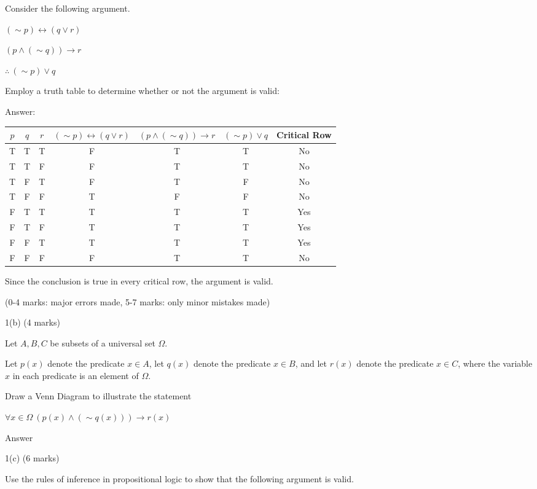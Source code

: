 \documentclass[a4paper,12pt,oneside]{book}
\theoremstyle{definition}
\begin{document}
Consider the following argument.

$(\sim p) \leftrightarrow (q \vee r)$

$(p \wedge (\sim q)) \rightarrow r$

$\therefore \ (\sim p) \vee q$

Employ a truth table to determine whether or not the argument is valid:

Answer:

\begin{center}
	\begin{tabular}{|ccc|c|c|c|c|}
		\hline
		$p$ & $q$ & $r$ &$(\sim p) \leftrightarrow (q \vee r)$ & $(p \wedge (\sim q)) \rightarrow r$ & $(\sim p) \vee q$ & Critical Row \\
		\hline
		T & T & T & F & T & T & No \\
		\hline
		T & T & F & F & T & T & No \\
		\hline
		T & F & T & F & T & F & No \\
		\hline
		T & F & F & T & F & F & No \\
		\hline
		F & T & T & T & T & T & Yes \\
		\hline
		F & T & F & T & T & T & Yes \\
		\hline
		F & F & T & T & T & T & Yes \\
		\hline
		F & F & F & F & T & T & No \\
		\hline  
	\end{tabular} 
\end{center}

Since the conclusion is true in every critical row, the argument is valid.

(0-4 marks: major errors made, 5-7 marks: only minor mistakes made)

1(b) (4 marks)

Let $A,B,C$ be subsets of a universal set $\Omega$.

Let $p(x)$ denote the predicate $x \in A$, let $q(x)$ denote the predicate $x \in B$, and let $r(x)$ denote the predicate $x \in C$, where the variable $x$ in each predicate is an element of $\Omega$.

Draw a Venn Diagram to illustrate the statement

$\forall x \in \Omega \ (p(x) \wedge (\sim q(x))) \rightarrow r(x)$

Answer

1(c) (6 marks)

Use the rules of inference in propositional logic to show that the following argument is valid.
\end{document}
